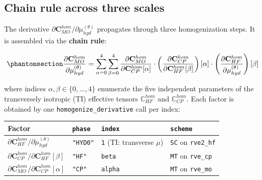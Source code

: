 \documentclass[
  a4paper,
  numbers=noendperiod,
  DIV=12]{scrreprt}
\newcounter{none} %
\begin{document}
\subsection{Chain rule across three scales}\label{sec-chain-rule}

The derivative
\(\partial \mathbf{C}^{hom}_{MO} / \partial \mu_{hyd}^{(\theta)}\)
propagates through three homogenization steps. It is assembled via the
\textbf{chain rule}:

\begin{equation}\protect\phantomsection\label{eq-chain}{
\frac{\partial \mathbf{C}^{hom}_{MO}}{\partial \mu_{hyd}^{(\theta)}}
= \sum_{\alpha=0}^{4}\sum_{\beta=0}^{4}
  \frac{\partial \mathbf{C}^{hom}_{MO}}{\partial \mathbf{C}^{hom}_{CP}[\alpha]}
  \cdot
  \left(\frac{\partial \mathbf{C}^{hom}_{CP}}{\partial \mathbf{C}^{hom}_{HF}[\beta]}\right)[\alpha]
  \cdot
  \left(\frac{\partial \mathbf{C}^{hom}_{HF}}{\partial \mu_{hyd}^{(\theta)}}\right)[\beta]
}\end{equation}

where indices \(\alpha, \beta \in \{0,\dots,4\}\) enumerate the five
independent parameters of the transversely isotropic (TI) effective
tensors \(\mathbb{C}^{hom}_{HF}\) and \(\mathbb{C}^{hom}_{CP}\). Each
factor is obtained by one \texttt{homogenize\_derivative} call per
index:

{\def\LTcaptype{none} %
\begin{longtable}[]{@{}
  >{\raggedright\arraybackslash}p{}
  >{\raggedright\arraybackslash}p{}
  >{\raggedright\arraybackslash}p{}
  >{\raggedright\arraybackslash}p{}@{}}
\toprule\noalign{}
\begin{minipage}[b]{\linewidth}\raggedright
Factor
\end{minipage} & \begin{minipage}[b]{\linewidth}\raggedright
\texttt{phase}
\end{minipage} & \begin{minipage}[b]{\linewidth}\raggedright
\texttt{index}
\end{minipage} & \begin{minipage}[b]{\linewidth}\raggedright
\texttt{scheme}
\end{minipage} \\
\midrule\noalign{}
\endhead
\bottomrule\noalign{}
\endlastfoot
\(\partial \mathbf{C}^{hom}_{HF}/\partial\mu_{hyd}^{(\theta)}\) &
\texttt{"HYD0"} & \texttt{1} (TI: transverse \(\mu\)) & \texttt{SC} on
\texttt{rve2\_hf} \\
\(\partial \mathbf{C}^{hom}_{CP}/\partial\mathbf{C}^{hom}_{HF}[\beta]\)
& \texttt{"HF"} & \texttt{beta} & \texttt{MT} on \texttt{rve\_cp} \\
\(\partial \mathbf{C}^{hom}_{MO}/\partial\mathbf{C}^{hom}_{CP}[\alpha]\)
& \texttt{"CP"} & \texttt{alpha} & \texttt{MT} on \texttt{rve\_mo} \\
\end{longtable}
}
\end{document}
